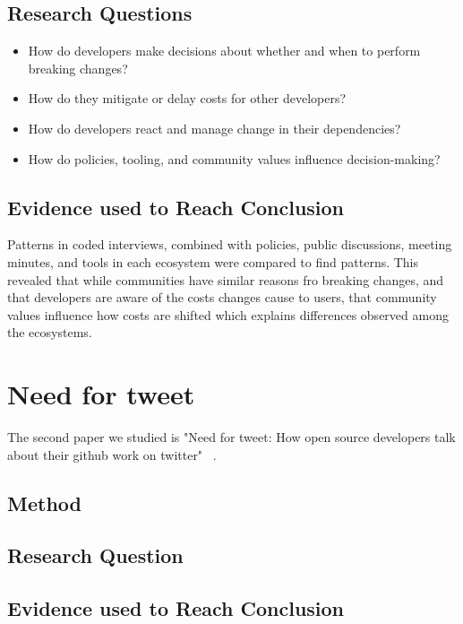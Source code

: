 \documentclass[conference]{IEEEtran}
\begin{document}
\subsection{Research Questions}

\begin{itemize}
    \item How do developers make decisions about whether and when to perform breaking changes?
    \item How do they mitigate or delay costs for other developers?
    \item How do developers react and manage change in their dependencies?
    \item How do policies, tooling, and community values influence decision-making?
\end{itemize}

\subsection{Evidence used to Reach Conclusion}

Patterns in coded interviews, combined with policies, public discussions, meeting minutes, and tools in each ecosystem were compared to find patterns. 
This revealed that while communities have similar reasons fro breaking changes, and that developers are aware of the costs changes cause to users, that community values influence how costs are shifted which explains differences observed among the ecosystems.

\section{Need for tweet}

The second paper we studied is "Need for tweet: How open source developers talk about their github work on twitter"~\cite{fang2020need} .

\subsection{Method}

\subsection{Research Question}

\subsection{Evidence used to Reach Conclusion}
\end{document}
